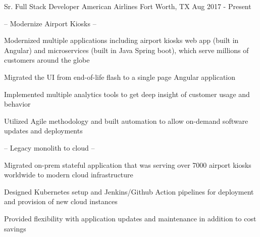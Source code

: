 

\begin{cventries}

  \cventry
    {Sr. Full Stack Developer} %
    {American Airlines} %
    {Fort Worth, TX} %
    {Aug 2017 - Present} %
    {}

  \cventry
    { -- Modernize Airport Kiosks -- } %
    {} %
    {} %
    {} %
    {
      \begin{cvitems} %
        \item {Modernized multiple applications including airport kiosks web app (built in Angular) and microservices (built in Java Spring boot), which serve millions of customers around the globe}
        \item {Migrated the UI from end-of-life flash to a single page Angular application}
        \item {Implemented multiple analytics tools to get deep insight of customer usage and behavior}
        \item {Utilized Agile methodology and built automation to allow on-demand software updates and deployments}
      \end{cvitems}
    }

  \cventry
    { -- Legacy monolith to cloud -- } %
    {} %
    {} %
    {} %
    {
      \begin{cvitems} %
        \item {Migrated on-prem stateful application that was serving over 7000 airport kiosks worldwide to modern cloud infrastructure}
        \item {Designed Kubernetes setup and Jenkins/Github Action pipelines for deployment and provision of new cloud instances}
        \item {Provided flexibility with application updates and maintenance in addition to cost savings}
      \end{cvitems}
    }


\end{cventries}
